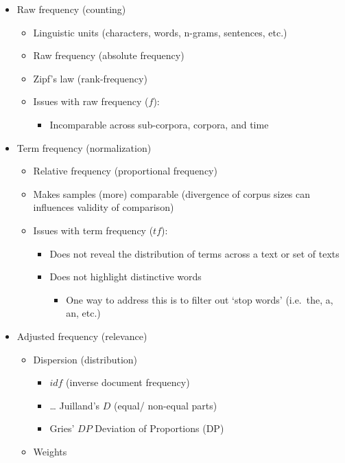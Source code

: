 \documentclass[
  letterpaper,
]{latex/krantz}
\providecommand{\tightlist}{%
  \setlength{\itemsep}{0pt}\setlength{\parskip}{0pt}}\usepackage{longtable,booktabs,array}
\begin{document}
\begin{itemize}
\tightlist
\item
  Raw frequency (counting)

  \begin{itemize}
  \tightlist
  \item
    Linguistic units (characters, words, n-grams, sentences, etc.)
  \item
    Raw frequency (absolute frequency)
  \item
    Zipf's law (rank-frequency)
  \item
    Issues with raw frequency (\(f\)):

    \begin{itemize}
    \tightlist
    \item
      Incomparable across sub-corpora, corpora, and time
    \end{itemize}
  \end{itemize}
\item
  Term frequency (normalization)

  \begin{itemize}
  \tightlist
  \item
    Relative frequency (proportional frequency)
  \item
    Makes samples (more) comparable (divergence of corpus sizes can
    influences validity of comparison)
  \item
    Issues with term frequency (\(tf\)):

    \begin{itemize}
    \tightlist
    \item
      Does not reveal the distribution of terms across a text or set of
      texts
    \item
      Does not highlight distinctive words

      \begin{itemize}
      \tightlist
      \item
        One way to address this is to filter out `stop words' (i.e.~the,
        a, an, etc.)
      \end{itemize}
    \end{itemize}
  \end{itemize}
\item
  Adjusted frequency (relevance)

  \begin{itemize}
  \tightlist
  \item
    Dispersion (distribution)

    \begin{itemize}
    \tightlist
    \item
      \(idf\) (inverse document frequency)
    \item
      \ldots{} Juilland's \(D\) (equal/ non-equal parts)
    \item
      Gries' \(DP\) Deviation of Proportions (DP)
    \end{itemize}
  \item
    Weights


\end{itemize}
\end{itemize}
\end{document}
